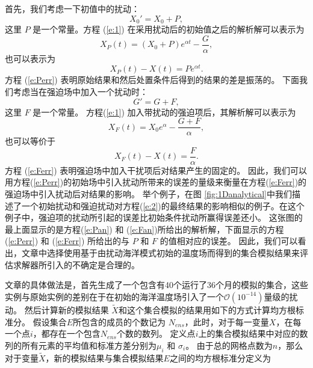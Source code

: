  
首先，我们考虑一下初值中的扰动：
\begin{equation*}
X_0' =X_0+P,
\end{equation*}
这里 $P$ 是一个常量。方程 (\ref{e:1}) 在采用扰动后的初始值之后的解析解可以表示为 
\begin{equation}
X_P(t) = (X_0+P)e^{\alpha t } -\frac{G}{\alpha}, 
\label{e:Pan}
\end{equation}
也可以表示为
\begin{equation}
X_P(t)-X(t) = Pe^{\alpha t }.
\label{e:Perr}
\end{equation}
方程 (\ref{e:Perr}) 表明原始结果和然后处置条件后得到的结果的差是振荡的。
下面我们考虑当在强迫场中加入一个扰动时： 
\begin{equation*}
G' = G + F,
\end{equation*}
这里 $F$ 是一个常量。  方程(\ref{e:1}) 加入带扰动的强迫项后，其解析解可以表示为
\begin{equation}
X_F(t) = X_0e^{\alpha } -\frac{G+F}{\alpha},
\label{e:Fan}
\end{equation}
也可以等价于
\begin{equation}
X_F(t)-X(t) = \frac{F}{\alpha}. 
\label{e:Ferr}
\end{equation}
方程 (\ref{e:Ferr}) 表明强迫场中加入干扰项后对结果产生的固定的。
因此，我们可以用方程(\ref{e:Perr})的初始场中引入扰动所带来的误差的量级来衡量在方程(\ref{e:Ferr})的强迫场中引入扰动后对结果的影响。 
举个例子，在图  \ref{fig:1Danalytical}中我们描述了一个初始扰动和强迫扰动对方程(\ref{e:2})的最终结果的影响相似的例子。在这个例子中，强迫项的扰动所引起的误差比初始条件扰动所赢得误差还小。
这张图的最上面显示的是方程(\ref{e:Pan}) 和 (\ref{e:Fan})所给出的解析解，下面显示的方程 (\ref{e:Perr}) 和 (\ref{e:Ferr}) 所给出的与 $P$ 和 $F$ 的值相对应的误差。 
因此，我们可以看出，文章中选择使用基于由扰动海洋模式初始的温度场而得到的集合模拟结果来评估求解器所引入的不确定是合理的。


 
文章的具体做法是，首先生成了一个包含有40个运行了36个月的模拟的集合，这些实例与原始实例的差别在于在初始的海洋温度场引入了一个$\mathcal{O}(10^{-14})$量级的扰动。 
然后计算新的模拟结果 $\tilde{{X}}$和这个集合模拟的结果用如下的方式计算均方根标准分。 假设集合$E$所包含的成员的个数记为 $N_{ens}$，此时，对于每一变量$X$，在每一个点$i$，都存在一个包含$N_{ens}$个数的数列。
定义点$i$上的集合模拟结果中对应的数列的所有元素的平均值和标准方差分别为$\mu_i$ 和 $\sigma_i$。 
由于总的网格点数为$n$，那么对于变量$\tilde{{X}}$，新的模拟结果与集合模拟结果$E$之间的均方根标准分定义为

